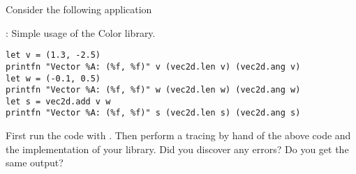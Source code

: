 Consider the following application
\begin{codeNOutput}{: Simple usage of the Color library.}
  \begin{lstlisting}
let v = (1.3, -2.5)
printfn "Vector %A: (%f, %f)" v (vec2d.len v) (vec2d.ang v)
let w = (-0.1, 0.5)
printfn "Vector %A: (%f, %f)" w (vec2d.len w) (vec2d.ang w)
let s = vec2d.add v w
printfn "Vector %A: (%f, %f)" s (vec2d.len s) (vec2d.ang s)
  \end{lstlisting}
\end{codeNOutput}
First run the code with . Then perform a tracing by hand of the above code and the implementation of your library. Did you discover any errors? Do you get the same output?
